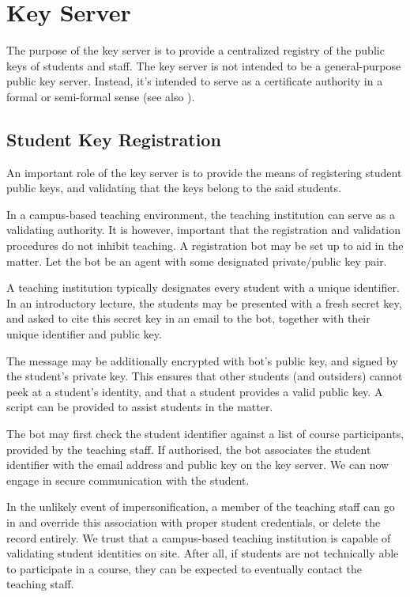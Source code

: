 
\section{Key Server}

The purpose of the key server is to provide a centralized registry of the
public keys of students and staff. The key server is not intended to be a
general-purpose public key server. Instead, it's intended to serve as a
certificate authority in a formal or semi-formal sense (see also
).

\subsection{Student Key Registration}

An important role of the key server is to provide the means of registering
student public keys, and validating that the keys belong to the said students.

In a campus-based teaching environment, the teaching institution can serve as a
validating authority. It is however, important that the registration and
validation procedures do not inhibit teaching. A registration bot may be set up
to aid in the matter. Let the bot be an agent with some designated
private/public key pair.

A teaching institution typically designates every student with a unique
identifier. In an introductory lecture, the students may be presented with a
fresh secret key, and asked to cite this secret key in an email to the bot,
together with their unique identifier and public key.

The message may be additionally encrypted with bot's public key, and signed by
the student's private key.  This ensures that other students (and outsiders)
cannot peek at a student's identity, and that a student provides a valid public
key. A script can be provided to assist students in the matter.

The bot may first check the student identifier against a list of course
participants, provided by the teaching staff. If authorised, the bot associates
the student identifier with the email address and public key on the key server.
We can now engage in secure communication with the student.

In the unlikely event of impersonification, a member of the teaching staff can
go in and override this association with proper student credentials, or delete
the record entirely. We trust that a campus-based teaching institution is
capable of validating student identities on site. After all, if students are
not technically able to participate in a course, they can be expected to
eventually contact the teaching staff.

